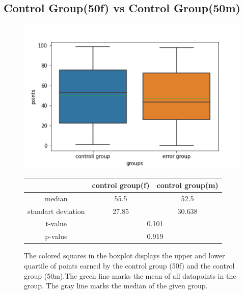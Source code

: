 \documentclass[runningheads]{llncs}
\begin{document}
\subsection{Control Group(50f) vs Control Group(50m)}
\begin{figure}
    \begin{minipage}{0.43\textwidth}        
        \includegraphics[width=\textwidth]{code/generate/all.png}
        \caption{The colored squares in the boxplot displays
        the upper and lower quartile of points earned by the control group (50f) and
        the control group (50m).The green line marks the mean of all datapoints in the group.
        The gray line marks the median  of the given group.} \label{fig5}
    \end{minipage}
\hfill
\begin{minipage}{0.43\textwidth}
\begin{tabular}[]{| c | c | c |}
        \hline
        & control group(f) & control group(m) \\
        \hline
        median & 55.5&52.5 \\
        \hline
        standart deviation & 27.85&30.638 \\
        \hline
        t-value & \multicolumn{2}{c|}{0.101} \\
        \hline
        p-value & \multicolumn{2}{c|}{0.919} \\
        \hline            
\end{tabular}
\end{minipage}
\end{figure}
\clearpage
\end{document}
